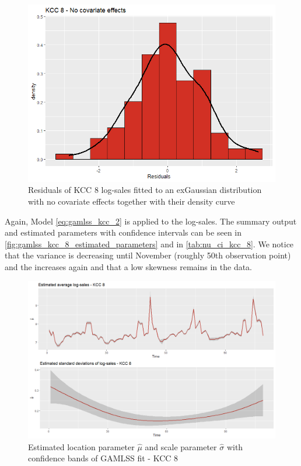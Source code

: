 \begin{figure}[H]
\centering
  \includegraphics[width=0.45\linewidth]{figures/res_kcc_8_no_covariates.png}
  \caption{Residuals of KCC 8 log-sales fitted to an exGaussian distribution with no covariate effects together with their density curve}
  \label{fig:res_kcc_8_no_covariates}
\end{figure}




Again, Model \ref{eq:gamlss_kcc_2} is applied to the log-sales. The summary output and estimated parameters with confidence intervals can be seen in \autoref{fig:gamlss_kcc_8_estimated_parameters} and in \autoref{tab:nu_ci_kcc_8}. We notice that the variance is decreasing until November (roughly 50th observation point) and the increases again and that a low skewness remains in the data.
\\









\begin{figure}[H]
\centering
  \includegraphics[width=0.95\linewidth]{figures/gamlss_kcc_8_estimated_parameters.png}
  \caption{Estimated location parameter $\hat{\mu}$ and scale parameter $\hat{\sigma}$ with confidence bands of GAMLSS fit - KCC 8}
  \label{fig:gamlss_kcc_8_estimated_parameters}
\end{figure}



